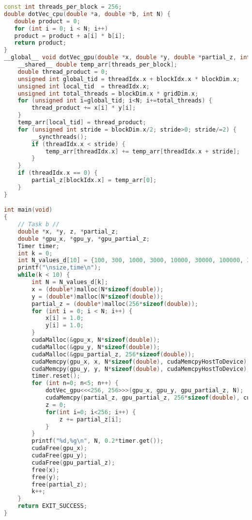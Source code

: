 \begin{appendix}
\begin{lstlisting}[language=C++, title=C++ Listing]
const int threads_per_block = 256;
double dotVec_cpu(double *a, double *b, int N) {
   double product = 0;
   for (int i = 0; i < N; i++)
   product = product + a[i] * b[i];
   return product;
}
__global__ void dotVec_gpu(double *x, double *y, double *partial_z, int N) {
	__shared__ double temp_arr[threads_per_block];
	double thread_product = 0;
	unsigned int global_tid = threadIdx.x + blockIdx.x * blockDim.x;
	unsigned int local_tid  = threadIdx.x;
	unsigned int total_threads = blockDim.x * gridDim.x;
	for (unsigned int i=global_tid; i<N; i+=total_threads) {
		thread_product += x[i] * y[i];
	}
	temp_arr[local_tid] = thread_product;
	for (unsigned int stride = blockDim.x/2; stride>0; stride/=2) {
		__syncthreads();
		if (threadIdx.x < stride) {
			temp_arr[threadIdx.x] += temp_arr[threadIdx.x + stride];
		}
	}
	if (threadIdx.x == 0) {
		partial_z[blockIdx.x] = temp_arr[0];
	}
}

int main(void)
{
	// Task b //	
	double *x, *y, z, *partial_z;
	double *gpu_x, *gpu_y, *gpu_partial_z;
	Timer timer;
	int k = 0;
	int N_values_d[10] = {100, 300, 1000, 3000, 10000, 30000, 100000, 300000, 1000000, 3000000};
	printf("\nsize,time\n");
	while(k < 10) {
		int N = N_values_d[k];
		x = (double*)malloc(N*sizeof(double));
		y = (double*)malloc(N*sizeof(double));
		partial_z = (double*)malloc(256*sizeof(double));
		for (int i = 0; i < N; i++) {
			x[i] = 1.0;
			y[i] = 1.0;
		}
		cudaMalloc(&gpu_x, N*sizeof(double)); 
		cudaMalloc(&gpu_y, N*sizeof(double));
		cudaMalloc(&gpu_partial_z, 256*sizeof(double));
		cudaMemcpy(gpu_x, x, N*sizeof(double), cudaMemcpyHostToDevice);
		cudaMemcpy(gpu_y, y, N*sizeof(double), cudaMemcpyHostToDevice);
		timer.reset();
		for (int n=0; n<5; n++) {
			dotVec_gpu<<<256, 256>>>(gpu_x, gpu_y, gpu_partial_z, N);
			cudaMemcpy(partial_z, gpu_partial_z, 256*sizeof(double), cudaMemcpyDeviceToHost);
			z = 0;
			for(int i=0; i<256; i++) {
				z += partial_z[i];
			}
		}
		printf("%d,%g\n", N, 0.2*timer.get());
		cudaFree(gpu_x);
		cudaFree(gpu_y);
		cudaFree(gpu_partial_z);
		free(x);
		free(y);
		free(partial_z);
		k++;
	}
	return EXIT_SUCCESS;
}
\end{lstlisting}
\pagebreak

\end{appendix}

